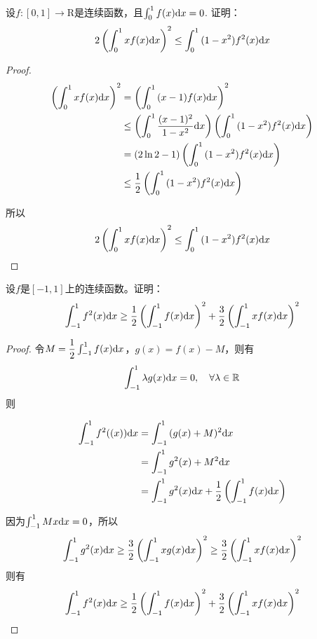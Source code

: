 \begin{proposition}

    设$f:[0, 1] \to \mathrm{R}$是连续函数，且$\int_{0}^{1}{f(x)}\mathrm{d} x = 0$. 证明：
    \[2 \left( \int_{0}^{1}{xf(x)}\mathrm{d} x \right)^2 \leq \int_{0}^{1}{(1 - x^2)f^2(x)}\mathrm{d} x\]

\end{proposition}

\begin{proof}

    \begin{align*}
        \left( \int_{0}^{1}{xf(x)}\mathrm{d} x \right)^2 & = \left( \int_{0}^{1}{(x - 1)f(x)}\mathrm{d} x \right)^2 \\
        & \leq \left( \int_{0}^{1}{\dfrac{(x - 1)^2}{1 - x^2}}\mathrm{d} x \right) \left( \int_{0}^{1}{(1 - x^2)f^2(x)}\mathrm{d} x \right) \\
        & = (2\ln{2} - 1)  \left( \int_{0}^{1}{(1 - x^2)f^2(x)}\mathrm{d} x \right) \\
        & \leq \dfrac{1}{2} \left( \int_{0}^{1}{(1 - x^2)f^2(x)}\mathrm{d} x \right)
    \end{align*}

    所以
    \[2 \left( \int_{0}^{1}{xf(x)}\mathrm{d} x \right)^2 \leq \int_{0}^{1}{(1 - x^2)f^2(x)}\mathrm{d} x\]

\end{proof}

\begin{proposition}

    设$f$是$[-1, 1]$上的连续函数。证明：
    \[\int_{-1}^{1}{f^2(x)}\mathrm{d} x \geq \dfrac{1}{2} \left( \int_{-1}^{1}{f(x)}\mathrm{d} x \right)^2 + \dfrac{3}{2} \left( \int_{-1}^{1}{xf(x)}\mathrm{d} x \right)^2\]

\end{proposition}

\begin{proof}

    令$M = \dfrac{1}{2} \int_{-1}^{1}{f(x)}\mathrm{d} x$，$g(x) = f(x) - M$，则有
    \[\int_{-1}^{1}{\lambda g(x)}\mathrm{d} x = 0, \quad \forall \lambda \in \mathbb{R}\]
    则

    \begin{align*}
        \int_{-1}^{1}{f^2((x))}\mathrm{d} x & = \int_{-1}^{1}{(g(x) + M)^2}\mathrm{d} x \\
        & = \int_{-1}^{1}{g^2(x) + M^2}\mathrm{d} x \\
        & = \int_{-1}^{1}{g^2(x)}\mathrm{d} x + \dfrac{1}{2} \left( \int_{-1}^{1}{f(x)}\mathrm{d} x \right)
    \end{align*}

    因为$\int_{-1}^{1}{Mx}\mathrm{d} x = 0$，所以
    \[\int_{-1}^{1}{g^2(x)}\mathrm{d} x \geq \dfrac{3}{2} \left( \int_{-1}^{1}{xg(x)}\mathrm{d} x \right)^2 \geq \dfrac{3}{2} \left( \int_{-1}^{1}{xf(x)}\mathrm{d} x \right)^2\]
    则有
    \[\int_{-1}^{1}{f^2(x)}\mathrm{d} x \geq \dfrac{1}{2} \left( \int_{-1}^{1}{f(x)}\mathrm{d} x \right)^2 + \dfrac{3}{2} \left( \int_{-1}^{1}{xf(x)}\mathrm{d} x \right)^2\]

\end{proof} 

